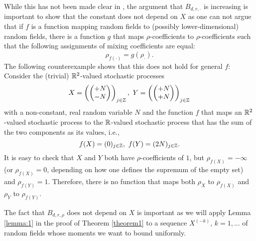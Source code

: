 \begin{remark}
    While this has not been made clear in \cite{[0]BUCCHIA2017344}, the argument that $B_{d, r, \cdot}$ is increasing is important to show that the constant does not depend on $X$ as one can not argue that if $f$ is a function mapping random fields to (possibly lower-dimensional) random fields, there is a function $g$ that maps $\rho$-coefficients to $\rho$-coefficients such that the following assignments of mixing coefficients are equal:
    \[ \rho_{f(\cdot)} = g(\rho_{\cdot}). \]
    The following counterexample shows that this does not hold for general $f$: Consider the (trivial) $\mathbb{R}^2$-valued stochastic processes
    \[ X = \left( \begin{pmatrix} +N \\ -N \end{pmatrix} \right)_{j \in \mathbb{Z}}, \ Y = \left( \begin{pmatrix} +N \\ +N \end{pmatrix} \right)_{j \in \mathbb{Z}} \]
    with a non-constant, real random variable $N$ and the function $f$ that maps an $\mathbb{R}^2$-valued stochastic process to the $\mathbb{R}$-valued stochastic process that has the sum of the two components as its values, i.e.,
    \[ f(X) = (0)_{j \in \mathbb{Z}}, \ f(Y) = (2N)_{j \in \mathbb{Z}}. \]
    It is easy to check that $X$ and $Y$ both have $\rho$-coefficients of $1$, but $\rho_{f(X)} = -\infty$ (or $\rho_{f(X)} = 0$, depending on how one defines the supremum of the empty set) and $\rho_{f(Y)} = 1$. Therefore, there is no function that maps both $\rho_{X}$ to $\rho_{f(X)}$ and $\rho_{Y}$ to $\rho_{f(Y)}$.

    The fact that $B_{d, r, \rho}$ does not depend on $X$ is important as we will apply Lemma \ref{lemma:1} in the proof of Theorem \ref{theorem1} to a sequence $X^{(-k)}$, $k=1, ...$ of random fields whose moments we want to bound uniformly.
\end{remark}
